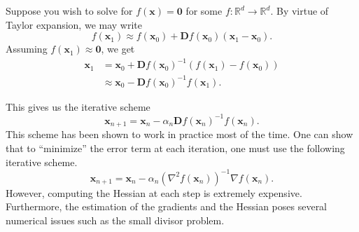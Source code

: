 Suppose you wish to solve for $f(\mathbf{x}) = \mathbf{0}$ for some $f \colon \mathbb{R}^d \to \mathbb{R}^d$. By virtue of Taylor expansion, we may write
\[
    f(\mathbf{x}_1) \approx f(\mathbf{x}_0) + \mathbf{D}f(\mathbf{x}_0) (\mathbf{x}_1 - \mathbf{x}_0).
\]
Assuming $f(\mathbf{x}_1) \approx \mathbf{0}$, we get
\begin{align*}
    \mathbf{x}_1 &= \mathbf{x}_0 + \mathbf{D}f(\mathbf{x}_0)^{-1} \left(f(\mathbf{x}_1) - f(\mathbf{x}_0) \right) \\
    &\approx \mathbf{x}_0 - \mathbf{D}f(\mathbf{x}_0)^{-1} f(\mathbf{x}_1).
\end{align*}

This gives us the iterative scheme
\[
    \mathbf{x}_{n+1} = \mathbf{x}_n - \alpha_n \mathbf{D}f(\mathbf{x}_n)^{-1} f(\mathbf{x}_n). 
\]
This scheme has been shown to work in practice most of the time. One can show that to ``minimize'' the error term at each iteration, one must use the following iterative scheme.
\[
    \mathbf{x}_{n+1} = \mathbf{x}_n - \alpha_n \left( \nabla^2 f(\mathbf{x}_n) \right)^{-1} \nabla f(\mathbf{x}_n).
\]
However, computing the Hessian at each step is extremely expensive. Furthermore, the estimation of the gradients and the Hessian poses several numerical issues such as the small divisor problem.  